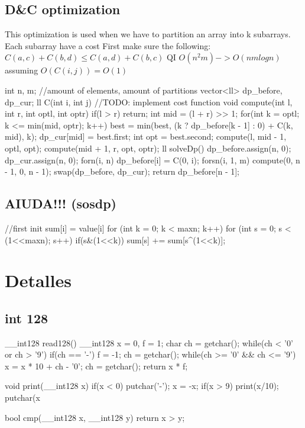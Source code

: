 \subsection{D&C optimization}
This optimization is used when we have to partition
an array into k subarrays. Each subarray have a cost
First make sure the following: 
$C(a, c) + C(b, d) \le C(a, d) + C(b, c)$ QI
$O(n^2m) -> O(nmlogn)$ assuming $O(C(i, j)) = O(1)$
\begin{code}
int n, m; //amount of elements, amount of partitions
vector<ll> dp_before, dp_cur;
ll C(int i, int j) {} //TODO: implement cost function
void compute(int l, int r, int optl, int optr) {
    if(l > r) return;
    int mid = (l + r) >> 1;
    for(int k = optl; k <= min(mid, optr); k++) {
        best = min(best, {(k ? dp_before[k - 1] : 0) + C(k, mid), k});
    }
    dp_cur[mid] = best.first;
    int opt = best.second;
    compute(l, mid - 1, optl, opt);
    compute(mid + 1, r, opt, optr);
}
ll solveDp() {
    dp_before.assign(n, 0);
    dp_cur.assign(n, 0);
    forn(i, n) dp_before[i] = C(0, i);
    forsn(i, 1, m) {
        compute(0, n - 1, 0, n - 1);
        swap(dp_before, dp_cur);
    }
    return dp_before[n - 1];
}
\end{code}
\subsection{AIUDA!!! (sosdp)}
\begin{code}
//first init sum[i] = value[i]
for (int k = 0; k < maxn; k++) {
    for (int s = 0; s < (1<<maxn); s++) {
        if(s&(1<<k)) sum[s] += sum[s^(1<<k)];
    }
}   
\end{code}
\section{Detalles}
\subsection{int 128}
\begin{code}
__int128 read128(){
	__int128 x = 0, f = 1;
	char ch = getchar();
	while(ch < '0' or ch > '9'){
		if(ch == '-') f = -1;
		ch = getchar();
	}
	while(ch >= '0' && ch <= '9'){
		x = x * 10 + ch - '0';
		ch = getchar();
	}
	return x * f;
}

void print(__int128 x){
	if(x < 0){
		putchar('-');
		x = -x;
	}
	if(x > 9) print(x/10);
	putchar(x%
}

bool cmp(__int128 x, __int128 y){
	return x > y;
}
\end{code}
